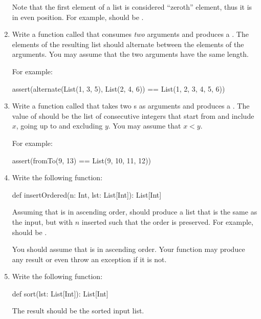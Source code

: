 \documentclass{book}
\begin{document}
\begin{enumerate}
  Note that the first element of a list is considered
  ``zeroth'' element, thus it is in even position.
  For example,  should be
  .

  \item Write a function called  that consumes \emph{two}
   arguments and produces a .
  The elements of the resulting list should alternate between the elements of
  the arguments. You may assume that the two arguments have the same
  length.

  For example:

  \begin{scalacode}
  assert(alternate(List(1, 3, 5), List(2, 4, 6)) == List(1, 2, 3, 4, 5, 6))
  \end{scalacode}

  \item Write a function called  that takes
  two s as arguments and produces a .
  The value of  should be the list of consecutive
  integers that start from and include $x$, going up to and excluding $y$.
  You may assume that $x < y$.

  For example:
  \begin{scalacode}
  assert(fromTo(9, 13) == List(9, 10, 11, 12))
  \end{scalacode}

  \item Write the following function:

  \begin{scalacode}
  def insertOrdered(n: Int, lst: List[Int]): List[Int]
  \end{scalacode}

  Assuming that  is in ascending order,
   should produce a list that is the same as
  the input, but with $n$ inserted such that the order is preserved.
  For example,  should be
  .

  You should assume that  is in ascending order. Your function
   may produce any result or even throw an exception if it is not.

   \item Write the following function:

   \begin{scalacode}
   def sort(lst: List[Int]): List[Int]
   \end{scalacode}

   The result should be the sorted input list.

\end{enumerate}
\end{document}
